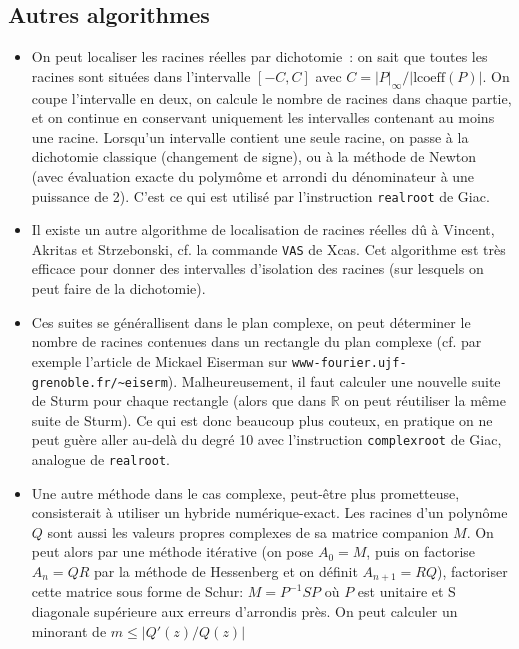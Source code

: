 \documentclass[a4paper,11pt]{article}
\newcommand{\R}{{\mathbb{R}}}
\begin{document}
\subsection{Autres algorithmes} \label{sec:autres_algorithmes}
\begin{itemize}
\item On peut localiser les racines r\'eelles par dichotomie~: on
sait que toutes les racines sont situ\'ees dans l'intervalle
$[-C,C]$ avec $C=|P|_{\infty}/|\mbox{lcoeff}(P)|$. On coupe
l'intervalle en deux, on calcule le nombre de racines
dans chaque partie, et on continue en conservant uniquement
les intervalles contenant au moins une racine. Lorsqu'un
intervalle contient une seule racine, on passe \`a la dichotomie
classique (changement de signe), ou \`a la m\'ethode de Newton
(avec \'evaluation exacte du polym\^ome et arrondi du d\'enominateur
\`a une puissance de 2). C'est ce qui est utilis\'e par
l'instruction \verb|realroot| de Giac.
\item Il existe un autre algorithme de localisation de racines
r\'eelles d\^u \`a Vincent, Akritas et 
Strzebonski, cf. la
commande \verb|VAS| de Xcas. Cet algorithme est tr\`es
efficace pour donner des intervalles d'isolation des racines
(sur lesquels on peut faire de la dichotomie).
\item Ces suites se g\'en\'erallisent dans le plan complexe, on
peut d\'eterminer le nombre de racines contenues dans un
rectangle du plan complexe (cf. par exemple l'article
de Mickael Eiserman sur \verb|www-fourier.ujf-grenoble.fr/~eiserm|). 
Malheureusement, il faut calculer une nouvelle suite de Sturm
pour chaque rectangle (alors que dans $\R$ on peut r\'eutiliser la
m\^eme suite de Sturm). Ce qui est donc beaucoup plus couteux,
en pratique on ne peut gu\`ere aller au-del\`a du degr\'e 10 avec
l'instruction \verb|complexroot| de Giac, analogue de \verb|realroot|.
\item Une autre m\'ethode dans le cas complexe, 
peut-\^etre plus prometteuse, consisterait \`a utiliser
un hybride num\'erique-exact. Les racines d'un polyn\^ome $Q$
sont aussi les valeurs
propres complexes de sa matrice companion $M$. On peut alors 
par une m\'ethode it\'erative (on pose $A_0=M$, puis on 
factorise $A_n=QR$ par la m\'ethode de Hessenberg et on d\'efinit
$A_{n+1}=RQ$), factoriser cette matrice 
sous forme de Schur: $M=P^{-1} S P$ o\`u $P$ est unitaire
et S diagonale sup\'erieure aux erreurs d'arrondis pr\`es. 
On peut calculer un minorant de $m \leq |Q'(z)/Q(z)|$ 

\end{itemize}
\end{document}
